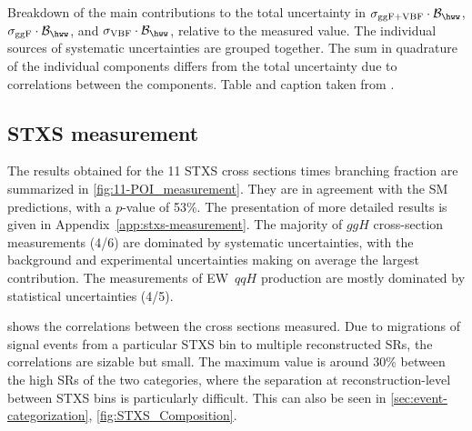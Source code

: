 \begin{table}[h!]
  \centering
  \caption[Breakdown of uncertainties in the inclusive cross-section measurement.]{
    Breakdown of the main contributions to the total uncertainty in $\sigma_{\mathrm{ggF+VBF}} \cdot \mathcal{B}_{\hww}$, $\sigma_{\mathrm{ggF}} \cdot \mathcal{B}_{\hww}$, and $\sigma_{\mathrm{VBF}} \cdot \mathcal{B}_{\hww}$, relative to the measured value.
    The individual sources of systematic uncertainties are grouped together.
    The sum in quadrature of the individual components differs from the total uncertainty due to correlations between the components.
    Table and caption taken from .
  }
  \resizebox{\textwidth}{!}{
    
  }
  \label{tab:UncertaintyBreakdown_2-POI}
\end{table}

\subsection{STXS measurement}
The results obtained for the 11 STXS cross sections times branching fraction are summarized in \cref{fig:11-POI_measurement}. 
They are in agreement with the SM predictions, with a $p$-value of 53\%.
The presentation of more detailed results is given in Appendix~\ref{app:stxs-measurement}. 
The majority of $ggH$ cross-section measurements (4/6) are dominated by systematic uncertainties, with the background and experimental uncertainties making on average the largest contribution. 
The measurements of EW~$qqH$ production are mostly dominated by statistical uncertainties (4/5). 

 shows the correlations between the cross sections measured. 
Due to migrations of signal events from a particular STXS bin to multiple reconstructed SRs, the correlations are sizable but small. 
The maximum value is around 30\% between the high \pTH SRs of the two \TwoJet categories, where the separation at reconstruction-level between STXS bins is particularly difficult. This can also be seen in \cref{sec:event-categorization}, \cref{fig:STXS_Composition}. 

